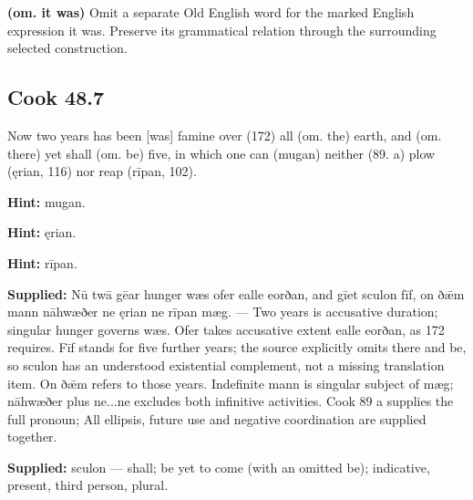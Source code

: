\textbf{(om. it was)} Omit a separate Old English word for the marked English expression it was. Preserve its grammatical relation through the surrounding selected construction.

\par\begin{minipage}{\linewidth}\raggedright
\subsection*{Cook 48.7}

Now two years has been [was] famine over (172) all (om. the) earth, and (om. there) yet shall (om. be) five, in which one can (mugan) neither (89. a) plow (ęrian, 116) nor reap (rīpan, 102).

\textbf{Hint:} mugan.

\textbf{Hint:} ęrian.

\textbf{Hint:} rīpan.

\end{minipage}\par\addvspace{4pt}

\textbf{Supplied:} Nū twā gēar hunger wæs ofer ealle eorðan, and gīet sculon fīf, on ðǣm mann nāhwæðer ne ęrian ne rīpan mæg. — Two years is accusative duration; singular hunger governs wæs. Ofer takes accusative extent ealle eorðan, as 172 requires. Fīf stands for five further years; the source explicitly omits there and be, so sculon has an understood existential complement, not a missing translation item. On ðǣm refers to those years. Indefinite mann is singular subject of mæg; nāhwæðer plus ne...ne excludes both infinitive activities. Cook 89 a supplies the full pronoun; All ellipsis, future use and negative coordination are supplied together.

\textbf{Supplied:} sculon — shall; be yet to come (with an omitted be); indicative, present, third person, plural.

